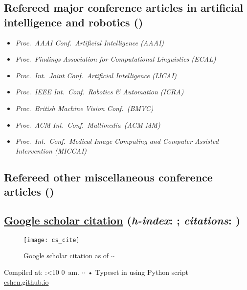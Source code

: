 \documentclass[9pt, a4paper]{article}
\newif\iftimePM
\def\now{\number\timehh:\ifnum\timemm<10 0\fi\number\timemm
         \iftimePM {$\,$pm.}  \else {$\,$am.}  \fi}
\edef\today{\number\day$\cdot$\number\month$\cdot$\number\year}
\begin{document}
\subsection*{Refereed major conference articles in artificial intelligence and robotics (\unskip)
}
{
\begin{itemize}
  \itemsep -.12cm
\footnotesize
\item \emph{  Proc.\ AAAI Conf.\ Artificial Intelligence (AAAI)}
\item \emph{  Proc.\ Findings Association for Computational Linguistics (ECAL)}    
\item \emph{  Proc.\ Int.\ Joint Conf.\ Artificial Intelligence (IJCAI)}
\item \emph{  Proc.\ IEEE Int.\ Conf.\  Robotics \&  Automation (ICRA)}
\item \emph{  Proc.\ British Machine Vision Conf.\ (BMVC)}
\item \emph{  Proc.\ ACM Int.\  Conf.\  Multimedia\ (ACM MM)}
\item \emph{  Proc.\ Int.\ Conf.\ Medical Image Computing and Computer Assisted Intervention (MICCAI)}

\end{itemize}
}




\noindent






\vspace{-0.15cm}
\subsection*{Refereed other miscellaneous  conference articles (\unskip)}
\noindent









\subsection*{\href{https://scholar.google.com/citations?hl=en&user=Ljk2BvIAAAAJ&view_op=list_works}{Google scholar citation} ({\it h-index}:  \unskip; {\it citations}: \unskip) }

\begin{figure}[h!]
\centering
\texttt{[image: cs\_cite]}
\caption{Google scholar citation as of \today}
\label{fig:google_scholar}
\end{figure}








\vfill{}
\begin{center}
{\scriptsize    Compiled at: \now \today\- •\- Typeset in {
\XeLaTeX{}
using Python script
}\\
\href{https://cshen.github.io}{cshen.github.io}
}
\end{center}
\end{document}
